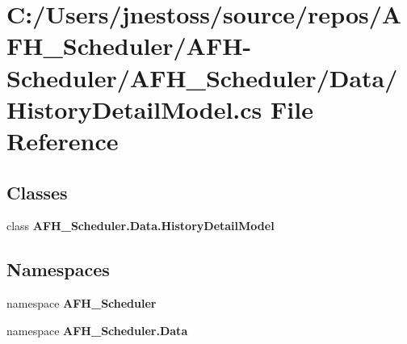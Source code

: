 \section{C\+:/\+Users/jnestoss/source/repos/\+A\+F\+H\+\_\+\+Scheduler/\+A\+F\+H-\/\+Scheduler/\+A\+F\+H\+\_\+\+Scheduler/\+Data/\+History\+Detail\+Model.cs File Reference}
\label{_history_detail_model_8cs}
\subsection*{Classes}
\begin{DoxyCompactItemize}
\item 
class \textbf{ A\+F\+H\+\_\+\+Scheduler.\+Data.\+History\+Detail\+Model}
\end{DoxyCompactItemize}
\subsection*{Namespaces}
\begin{DoxyCompactItemize}
\item 
namespace \textbf{ A\+F\+H\+\_\+\+Scheduler}
\item 
namespace \textbf{ A\+F\+H\+\_\+\+Scheduler.\+Data}
\end{DoxyCompactItemize}

